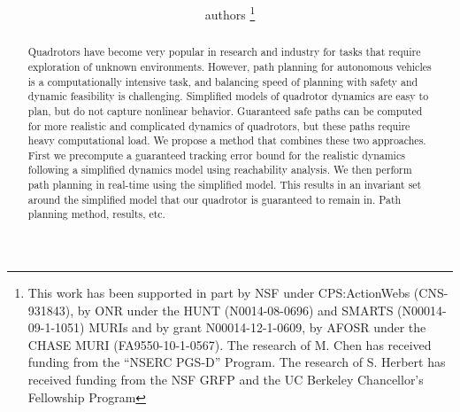 \documentclass[letterpaper, 10pt, conference]{ieeeconf}      %
\title{\LARGE \bf \MCnote{A Very Good Title}}
\author{authors
\thanks{\color{red}This work has been supported in part by NSF under CPS:ActionWebs (CNS-931843), by ONR under the HUNT (N0014-08-0696) and SMARTS (N00014-09-1-1051) MURIs and by grant N00014-12-1-0609, by AFOSR under the CHASE MURI (FA9550-10-1-0567). The research of M. Chen has received funding from the ``NSERC PGS-D'' Program. The research of S. Herbert has received funding from the NSF GRFP and the UC Berkeley Chancellor's Fellowship Program}
}
\begin{document}
\maketitle
\thispagestyle{empty}
\pagestyle{empty}

\begin{abstract}

Quadrotors have become very popular in research and industry for tasks that require exploration of unknown environments. However, path planning for autonomous vehicles is a computationally intensive task, and balancing speed of planning with safety and dynamic feasibility is challenging. Simplified models of quadrotor dynamics are easy to plan, but do not capture nonlinear behavior. Guaranteed safe paths can be computed for more realistic and complicated dynamics of quadrotors, but these paths require heavy computational load. We propose a method that combines these two approaches. First we precompute a guaranteed tracking error bound for the realistic dynamics following a simplified dynamics model using reachability analysis. We then perform path planning in real-time using the simplified model. This results in an invariant set around the simplified model that our quadrotor is guaranteed to remain in.  \color{red} Path planning method, results, etc.
\end{abstract}


















\end{document}
